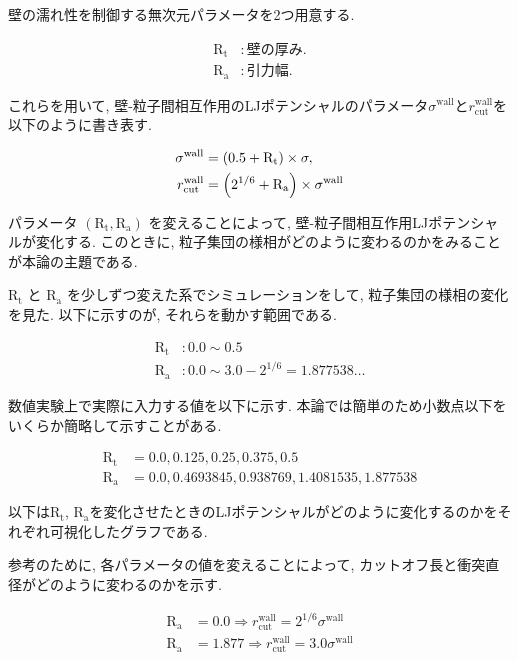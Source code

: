 壁の濡れ性を制御する無次元パラメータを2つ用意する.

\begin{align}
  \text{R}_\text{t} &: 壁の厚み. \\
  \text{R}_\text{a} &: 引力幅.
\end{align}

これらを用いて, 壁-粒子間相互作用のLJポテンシャルのパラメータ$\sigma^{\text{wall}}$と$r^{\text{wall}}_{\text{cut}}$を以下のように書き表す.

\begin{align}
  \sigma^{\text{wall}} &= \qty(0.5 + \text{R}_\text{t}) \times \sigma , \\
  r^{\text{wall}}_{\text{cut}} &= \qty(2^{1/6} + \text{R}_\text{a}) \times \sigma^{\text{wall}} 
\end{align}

パラメータ $(\text{R}_\text{t}, \text{R}_\text{a})$ を変えることによって, 壁-粒子間相互作用LJポテンシャルが変化する. このときに, 粒子集団の様相がどのように変わるのかをみることが本論の主題である.

$\text{R}_\text{t}$ と $\text{R}_\text{a}$ を少しずつ変えた系でシミュレーションをして, 粒子集団の様相の変化を見た. 以下に示すのが, それらを動かす範囲である.

\begin{align}
  \text{R}_\text{t} &\colon 0.0 \sim 0.5 \\
  \text{R}_\text{a} &\colon 0.0 \sim 3.0 - 2^{1/6} = 1.877538\dots
\end{align}

数値実験上で実際に入力する値を以下に示す. 本論では簡単のため小数点以下をいくらか簡略して示すことがある.

\begin{align}
  \text{R}_\text{t} &= 0.0,  0.125,  0.25,  0.375,  0.5 \\
  \text{R}_\text{a} &= 0.0,  0.4693845,  0.938769,  1.4081535,  1.877538
\end{align}

以下は$\text{R}_\text{t}$, $\text{R}_\text{a}$を変化させたときのLJポテンシャルがどのように変化するのかをそれぞれ可視化したグラフである.

参考のために, 各パラメータの値を変えることによって, カットオフ長と衝突直径がどのように変わるのかを示す.

\begin{align}
  \text{R}_\text{a} &= 0.0 \Rightarrow r_{\text{cut}}^{\text{wall}} = 2^{1/6} \sigma^{\text{wall}} \\
  \text{R}_\text{a} &= 1.877 \Rightarrow r_{\text{cut}}^{\text{wall}} = 3.0 \sigma^{\text{wall}} 
\end{align}

